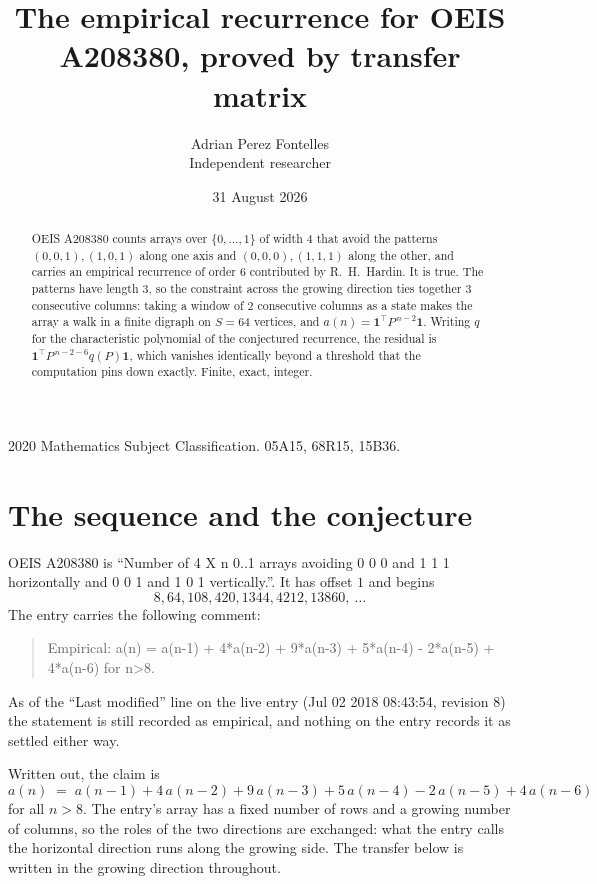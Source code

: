 \documentclass[11pt,a4paper]{article}
\title{The empirical recurrence for OEIS A208380, proved by transfer matrix}
\author{Adrian Perez Fontelles\\ \small Independent researcher}
\date{31 August 2026}
\theoremstyle{plain}
\theoremstyle{definition}
\begin{document}
\maketitle

\begin{abstract}
OEIS A208380 counts arrays over $\{0,\dots,1\}$ of width $4$ that avoid the patterns
$(0,0,1), (1,0,1)$ along one axis and $(0,0,0), (1,1,1)$ along the other, and carries an empirical recurrence of
order $6$ contributed by R.~H.~Hardin. It is true. The patterns have length $3$, so
the constraint across the growing direction ties together $3$ consecutive columns: taking a
window of $2$ consecutive columns as a state makes the array a walk in a finite digraph
on $S=64$ vertices, and $a(n)=\mathbf{1}^{\!\top}P^{\,n-2}\mathbf{1}$. Writing $q$
for the characteristic polynomial of the conjectured recurrence, the residual is
$\mathbf{1}^{\!\top}P^{\,n-2-6}q(P)\mathbf{1}$, which vanishes identically
beyond a threshold that the computation pins down exactly. Finite, exact, integer.
\end{abstract}

\noindent\small 2020 Mathematics Subject Classification. 05A15, 68R15, 15B36.\normalsize

\section{The sequence and the conjecture}

OEIS A208380 is ``Number of 4 X n 0..1 arrays avoiding 0 0 0 and 1 1 1 horizontally and 0 0 1 and 1 0 1 vertically.''. It has offset
$1$ and begins
\[
8, 64, 108, 420, 1344, 4212, 13860,\ \dots
\]
The entry carries the following comment:
\begin{quote}\small
Empirical: a(n) = a(n-1) + 4*a(n-2) + 9*a(n-3) + 5*a(n-4) - 2*a(n-5) + 4*a(n-6) for n>8.
\end{quote}
As of the ``Last modified'' line on the live entry (Jul 02 2018 08:43:54, revision
8) the statement is still recorded as empirical, and nothing on the entry
records it as settled either way.

Written out, the claim is
\begin{equation}\label{eq:conj}
a(n)\;=\;a(n-1) + 4\,a(n-2) + 9\,a(n-3) + 5\,a(n-4) - 2\,a(n-5) + 4\,a(n-6)
\end{equation}
for all $n>8$. The entry's array has a fixed number of rows and a growing number of
columns, so the roles of the two directions are exchanged: what the entry calls the
horizontal direction runs along the growing side. The transfer below is written in the
growing direction throughout.
\end{document}
